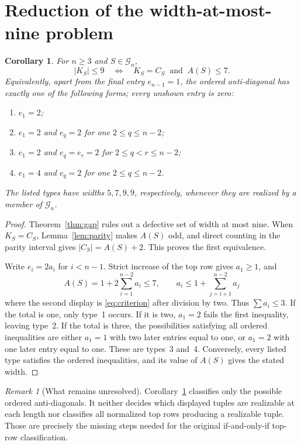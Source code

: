 \documentclass[11pt]{article}
\newtheorem{corollary}[theorem]{Corollary}
\theoremstyle{remark}
\newtheorem{remark}[theorem]{Remark}
\newcommand{\G}{\mathcal G}
\begin{document}
\section{Reduction of the width-at-most-nine problem}

\begin{corollary}\label{cor:reduction}
For $n\ge3$ and $S\in\G_n$,
\[
 |K_S|\le9
 \quad\Longleftrightarrow\quad
 K_S=C_S\ \text{ and }\ A(S)\le7.
\]
Equivalently, apart from the final entry $e_{n-1}=1$, the ordered
anti-diagonal has exactly one of the following forms; every unshown entry is
zero:
\begin{enumerate}
 \item $e_1=2$;
 \item $e_1=2$ and $e_q=2$ for one $2\le q\le n-2$;
 \item $e_1=2$ and $e_q=e_r=2$ for
       $2\le q<r\le n-2$;
 \item $e_1=4$ and $e_q=2$ for one $2\le q\le n-2$.
\end{enumerate}
The listed types have widths $5,7,9,9$, respectively, whenever they are
realized by a member of $\G_n$.
\end{corollary}

\begin{proof}
Theorem~\ref{thm:gap} rules out a defective set of width at most nine.  When
$K_S=C_S$, Lemma~\ref{lem:parity} makes $A(S)$ odd, and direct counting in
the parity interval gives $|C_S|=A(S)+2$.  This proves the first
equivalence.

Write $e_i=2a_i$ for $i<n-1$.  Strict increase of the top row gives
$a_1\ge1$, and
\[
 A(S)=1+2\sum_{i=1}^{n-2}a_i\le7,
 \qquad
 a_i\le1+\sum_{j=i+1}^{n-2}a_j
\]
where the second display is \eqref{eq:criterion} after division by two.
Thus $\sum a_i\le3$.  If the total is one, only type~1 occurs.  If it is
two, $a_1=2$ fails the first inequality, leaving type~2.  If the total is
three, the possibilities satisfying all ordered inequalities are either
$a_1=1$ with two later entries equal to one, or $a_1=2$ with one later entry
equal to one.  These are types~3 and~4.  Conversely, every listed type
satisfies the ordered inequalities, and its value of $A(S)$ gives the stated
width.
\end{proof}

\begin{remark}[What remains unresolved]
Corollary~\ref{cor:reduction} classifies only the possible ordered
anti-diagonals.  It neither decides which displayed tuples are realizable at
each length nor classifies all normalized top rows producing a realizable
tuple.  Those are precisely the missing steps needed for the original
if-and-only-if top-row classification.
\end{remark}
\end{document}
